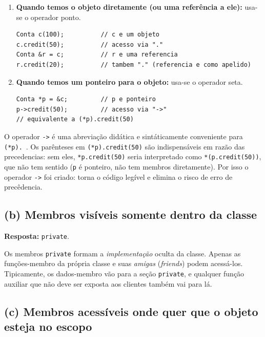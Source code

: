\documentclass[11pt,a4paper]{article}
\begin{document}
\begin{enumerate}[leftmargin=*,itemsep=0pt]
  \item \textbf{Quando temos o objeto diretamente (ou uma refer\^encia a ele):} usa-se o operador ponto.
    \begin{lstlisting}[style=cppcode,numbers=none]
Conta c(100);          // c e um objeto
c.credit(50);          // acesso via "."
Conta &r = c;          // r e uma referencia
r.credit(20);          // tambem "." (referencia e como apelido)
    \end{lstlisting}
  \item \textbf{Quando temos um ponteiro para o objeto:} usa-se o operador seta.
    \begin{lstlisting}[style=cppcode,numbers=none]
Conta *p = &c;         // p e ponteiro
p->credit(50);         // acesso via "->"
// equivalente a (*p).credit(50)
    \end{lstlisting}
\end{enumerate}

\begin{obseng}
O operador \texttt{->} \'e uma abrevia\c{c}\~ao did\'atica e sint\'aticamente conveniente para \texttt{(*p).}~. Os par\^enteses em \texttt{(*p).credit(50)} s\~ao indispens\'aveis em raz\~ao das precedencias: sem eles, \texttt{*p.credit(50)} seria interpretado como \texttt{*(p.credit(50))}, que n\~ao tem sentido (\texttt{p} \'e ponteiro, n\~ao tem membros diretamente). Por isso o operador \texttt{->} foi criado: torna o c\'odigo leg\'ivel e elimina o risco de erro de prec\^edencia.
\end{obseng}

\subsection*{(b) Membros vis\'iveis somente dentro da classe}

\begin{resposta}\textbf{Resposta:} \texttt{private}.\end{resposta}

Os membros \texttt{private} formam a \emph{implementa\c{c}\~ao} oculta da classe. Apenas as fun\c{c}\~oes-membro da pr\'opria classe e suas \emph{amigas} (\emph{friends}) podem acess\'a-los. Tipicamente, os dados-membro v\~ao para a se\c{c}\~ao \texttt{private}, e qualquer fun\c{c}\~ao auxiliar que n\~ao deve ser exposta aos clientes tamb\'em vai para l\'a.

\subsection*{(c) Membros acess\'iveis onde quer que o objeto esteja no escopo}
\end{document}
